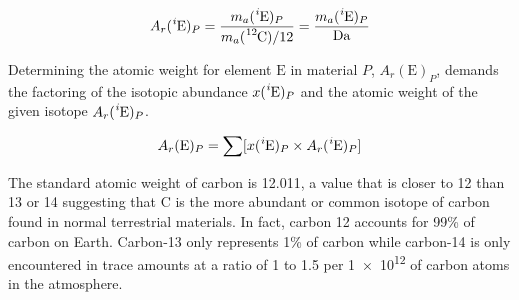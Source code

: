 \begin{equation}\label{eq:atomicweightforisotope}
  A_r(\mathrm { \ce{^i}E })_P =
  \frac{ m_a(\mathrm { \ce{^i}E })_P }{ m_a(\mathrm { \ce{^{12}}C })/12 } =
  \frac{ m_a(\mathrm { \ce{^i}E })_P }{ \si{\dalton} }
\end{equation}

Determining the atomic weight for element $\mathrm E$ in material $P$,
$A_r(\mathrm E)_P$, demands the factoring of the isotopic abundance
$x(\mathrm { \ce{^{i}E} })_P$ and the atomic weight of the given isotope
$A_r(\mathrm { \ce{^i}E })_P$.

\begin{equation}\label{eq:atomicweightforelement}
  A_r(\mathrm E)_P =
  \sum [x(\mathrm { \ce{^i}E })_P \times A_r( \mathrm { \ce{^i}E } )_P]
\end{equation}

The standard atomic weight of carbon is \num{12.011}\cite{atomic-weights-2013},
a value that is closer to \num{12} than \num{13} or \num{14} suggesting that
C is the more abundant or common isotope of carbon found in
normal terrestrial materials. In fact, carbon 12 accounts for 99\% of carbon
on Earth. Carbon-13 only represents 1\% of carbon while carbon-14 is only
encountered in trace amounts at a ratio of 1 to 1.5 per \num{1e12} of carbon
atoms in the atmosphere.

